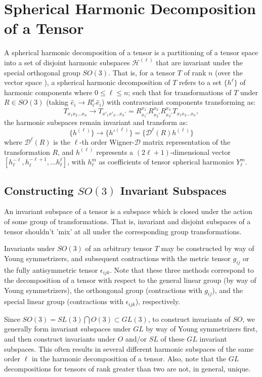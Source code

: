 \documentclass[10pt,a4paper]{article}
\begin{document}
\section{Spherical Harmonic Decomposition of a Tensor}
A spherical harmonic decomposition of a tensor is a partitioning of a tensor space into a set of disjoint harmonic subspaces $\mathcal{H}^{(\ell)}$ that are invariant under the special orthogonal group $SO(3)$. That is, for a tensor $T$ of rank $n$ (over the vector space ), a spherical harmonic decomposition of $T$ refers to a set $\lbrace h^{\ell}\rbrace$ of harmonic components where $0\leq \ell\leq n$; such that for transformations of $T$ under $R\in SO(3)$ (taking $\hat{e}_i\rightarrow R^i_{i'}\hat{e}_i$) with contravariant components transforming as:
$$
T_{x_1x_2...x_n}\rightarrow T_{x'_1x'_2...x_n'}=R_{x_1'}^{x_1} R_{x_2'}^{x_2} R_{x_3'}^{x_3}T_{x_1x_2...x_n},
$$
the harmonic subspaces remain invariant and transform as:
$$
\lbrace h^{(\ell)}\rbrace \rightarrow \lbrace h'^{(\ell)}\rbrace = \lbrace \mathcal{D}^{\ell}(R) h^{(\ell)}\rbrace
$$
where $\mathcal{D}^{\ell}(R)$ is the $\ell$-th order Wigner-$\mathcal{D}$ matrix representation of the transformation $R$, and $h^{(\ell)}$ represents a $(2\ell +1)$-dimensional vector  $[h_{\ell}^{-\ell},h_{\ell}^{-\ell+1},... h_{\ell}^{\ell}]$, with $h_{\ell}^{m}$ as coefficients of tensor spherical harmonics $Y_{\ell}^m$.

\subsection{Constructing $SO(3)$ Invariant Subspaces}
An invariant subspace of a tensor is a subspace which is closed under the action of some group of transformations. That is, invariant and disjoint subspaces of a tensor shouldn't 'mix' at all under the corresponding group transformations. 

Invariants under $SO(3)$ of an arbitrary tensor $T$ may be constructed by way of Young symmetrizers, and subsequent contractions with the metric tensor $g_{ij}$ or the fully antisymmetric tensor $\epsilon_{ijk}$. Note that these three methods correspond to the decomposition of a tensor with respect to the general linear group (by way of Young symmetrizers), the orthongonal group (contractions with $g_{ij}$), and the special linear group (contractions with $\epsilon_{ijk}$), respectively. 

Since $SO(3) =   SL(3)\bigcap O(3) \subset GL(3) $, to construct invariants of $SO$, we generally form invariant subspaces under $GL$ by way of Young symmetrizers first, and then construct invariants under $O$ and/or $SL$ of these $GL$ invariant subspaces. This often results in several different harmonic subspaces of the same order $\ell$  in the harmonic decomposition of a tensor.
Also, note that the $GL$ decompositions for tensors of rank greater than two are not, in general, unique.
\end{document}
